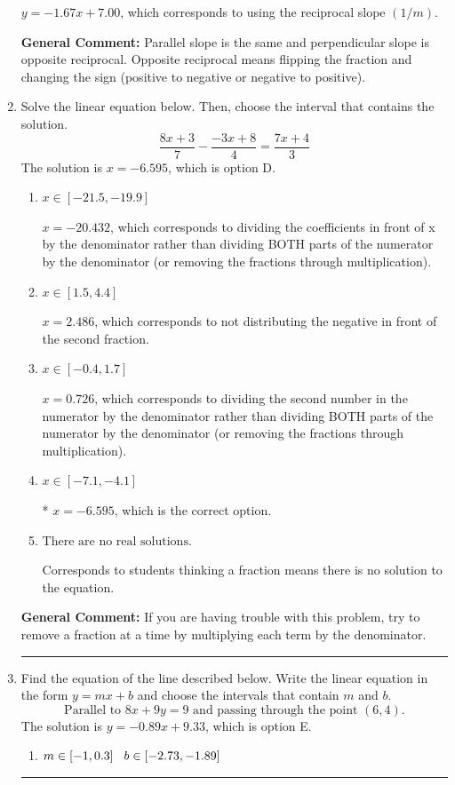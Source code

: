 \documentclass{extbook}[14pt]
\newcommand{\litem}[1]{\item #1

\rule{\textwidth}{0.4pt}}
\begin{document}
\begin{enumerate}
{\begin{enumerate}[label=\Alph*.]
 $y = -1.67x + 7.00$, which corresponds to using the reciprocal slope $(1/m)$.
\end{enumerate}

\textbf{General Comment:} Parallel slope is the same and perpendicular slope is opposite reciprocal. Opposite reciprocal means flipping the fraction and changing the sign (positive to negative or negative to positive).
}
\litem{
Solve the linear equation below. Then, choose the interval that contains the solution.
\[ \frac{8x + 3}{7} - \frac{-3x + 8}{4} = \frac{7x + 4}{3} \]The solution is \( x = -6.595 \), which is option D.\begin{enumerate}[label=\Alph*.]
\item \( x \in [-21.5, -19.9] \)

 $x = -20.432$, which corresponds to dividing the coefficients in front of x by the denominator rather than dividing BOTH parts of the numerator by the denominator (or removing the fractions through multiplication).
\item \( x \in [1.5, 4.4] \)

 $x = 2.486$, which corresponds to not distributing the negative in front of the second fraction.
\item \( x \in [-0.4, 1.7] \)

 $x = 0.726$, which corresponds to dividing the second number in the numerator by the denominator rather than dividing BOTH parts of the numerator by the denominator (or removing the fractions through multiplication).
\item \( x \in [-7.1, -4.1] \)

* $x = -6.595$, which is the correct option.
\item \( \text{There are no real solutions.} \)

Corresponds to students thinking a fraction means there is no solution to the equation.
\end{enumerate}

\textbf{General Comment:} If you are having trouble with this problem, try to remove a fraction at a time by multiplying each term by the denominator.
}
\litem{
Find the equation of the line described below. Write the linear equation in the form $ y=mx+b $ and choose the intervals that contain $m$ and $b$.
\[ \text{Parallel to } 8 x + 9 y = 9 \text{ and passing through the point } (6, 4). \]The solution is \( y = -0.89x + 9.33 \), which is option E.\begin{enumerate}[label=\Alph*.]
\item \( m \in [-1, 0.3] \hspace*{3mm} b \in [-2.73, -1.89] \)


\end{enumerate}}
\end{enumerate}
\end{document}
